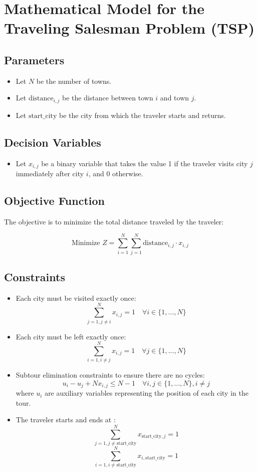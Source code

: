 \documentclass{article}
\begin{document}
\section*{Mathematical Model for the Traveling Salesman Problem (TSP)}

\subsection*{Parameters}
\begin{itemize}
    \item Let \( N \) be the number of towns.
    \item Let \( \text{distance}_{i,j} \) be the distance between town \( i \) and town \( j \).
    \item Let \( \text{start\_city} \) be the city from which the traveler starts and returns.
\end{itemize}

\subsection*{Decision Variables}
\begin{itemize}
    \item Let \( x_{i,j} \) be a binary variable that takes the value 1 if the traveler visits city \( j \) immediately after city \( i \), and 0 otherwise.
\end{itemize}

\subsection*{Objective Function}
The objective is to minimize the total distance traveled by the traveler:

\[
\text{Minimize } Z = \sum_{i=1}^{N} \sum_{j=1}^{N} \text{distance}_{i,j} \cdot x_{i,j}
\]

\subsection*{Constraints}
\begin{itemize}
    \item Each city must be visited exactly once:
    \[
    \sum_{j=1, j \neq i}^{N} x_{i,j} = 1 \quad \forall i \in \{1, ..., N\}
    \]
    \item Each city must be left exactly once:
    \[
    \sum_{i=1, i \neq j}^{N} x_{i,j} = 1 \quad \forall j \in \{1, ..., N\}
    \]
    \item Subtour elimination constraints to ensure there are no cycles:
    \[
    u_i - u_j + N x_{i,j} \leq N-1 \quad \forall i,j \in \{1, ..., N\}, i \neq j
    \]
    where \( u_i \) are auxiliary variables representing the position of each city in the tour.
    \item The traveler starts and ends at :
    \[
    \sum_{j=1, j \neq \text{start\_city}}^{N} x_{\text{start\_city},j} = 1
    \]
    \[
    \sum_{i=1, i \neq \text{start\_city}}^{N} x_{i,\text{start\_city}} = 1
    \]
\end{itemize}
\end{document}
